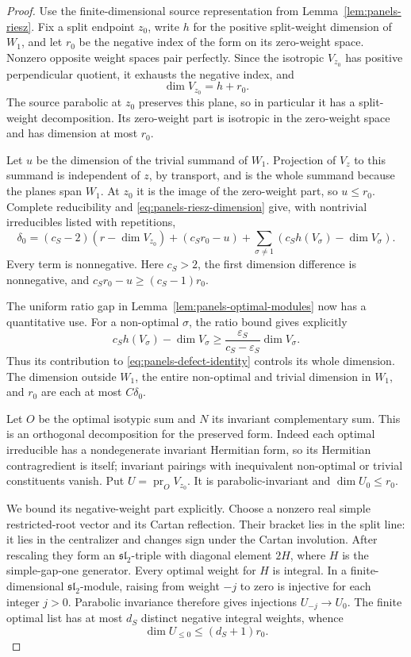 \begin{proof}
Use the finite-dimensional source representation from
Lemma~\ref{lem:panels-riesz}.  Fix a split endpoint $z_0$, write $h$ for
the positive split-weight dimension of $W_1$, and let $r_0$ be the
negative index of the form on its zero-weight space.  Nonzero opposite
weight spaces pair perfectly.  Since the isotropic $V_{z_0}$ has positive
perpendicular quotient, it exhausts the negative index, and
\[
 \dim V_{z_0}=h+r_0.
\]
The source parabolic at $z_0$ preserves this plane, so in particular it
has a split-weight decomposition.  Its zero-weight part is isotropic in
the zero-weight space and has dimension at most $r_0$.

Let $u$ be the dimension of the trivial summand of $W_1$.  Projection of
$V_z$ to this summand is independent of $z$, by transport, and is the
whole summand because the planes span $W_1$.  At $z_0$ it is the image of
the zero-weight part, so $u\leq r_0$.  Complete reducibility and
\eqref{eq:panels-riesz-dimension} give, with nontrivial irreducibles
listed with repetitions,
\begin{equation}\label{eq:panels-defect-identity}
 \delta_0=(c_S-2)(r-\dim V_{z_0})+(c_Sr_0-u)
       +\sum_{\sigma\ne1}(c_Sh(V_\sigma)-\dim V_\sigma).
\end{equation}
Every term is nonnegative.  Here $c_S>2$, the first dimension difference
is nonnegative, and $c_Sr_0-u\geq(c_S-1)r_0$.

The uniform ratio gap in Lemma~\ref{lem:panels-optimal-modules} now has a
quantitative use.  For a non-optimal $\sigma$, the ratio bound gives explicitly
\[
 c_Sh(V_\sigma)-\dim V_\sigma
 \geq\frac{\varepsilon_S}{c_S-\varepsilon_S}\dim V_\sigma.
\]
Thus its contribution to \eqref{eq:panels-defect-identity} controls its
whole dimension.  The dimension outside $W_1$, the entire
non-optimal and trivial dimension in $W_1$, and $r_0$ are each at most
$C\delta_0$.

Let $O$ be the optimal isotypic sum and $N$ its invariant complementary
sum.  This is an orthogonal decomposition for the preserved form.  Indeed
each optimal irreducible has a nondegenerate invariant Hermitian form,
so its Hermitian contragredient is itself; invariant pairings with
inequivalent non-optimal or trivial constituents vanish.  Put
$U=\operatorname{pr}_O V_{z_0}$.  It is parabolic-invariant and
$\dim U_0\leq r_0$.

We bound its negative-weight part explicitly.  Choose a nonzero real
simple restricted-root vector and its Cartan reflection.  Their bracket
lies in the split line: it lies in the centralizer and changes sign under
the Cartan involution.  After rescaling they form an
$\mathfrak{sl}_2$-triple with diagonal element $2H$, where $H$ is the
simple-gap-one generator.  Every optimal weight for $H$ is integral.
In a finite-dimensional $\mathfrak{sl}_2$-module, raising from weight
$-j$ to zero is injective for each integer $j>0$.  Parabolic invariance
therefore gives injections $U_{-j}\to U_0$.  The finite optimal list has
at most $d_S$ distinct negative integral weights, whence
\[
 \dim U_{\leq0}\leq(d_S+1)r_0.
\]


\end{proof}
